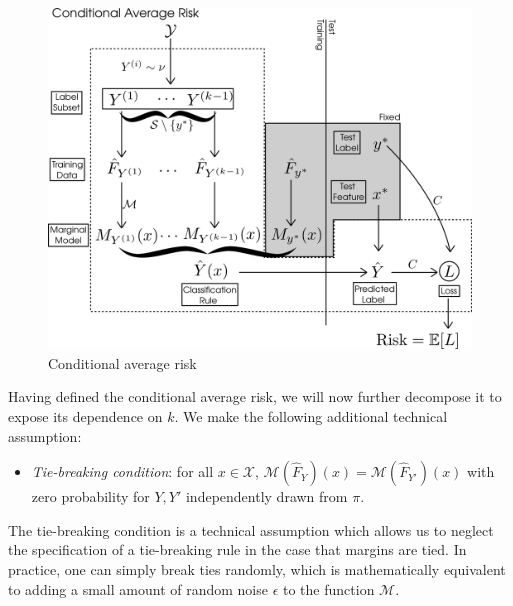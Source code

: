 \documentclass[12pt]{article}
\begin{document}

\begin{figure}[h]
\centering
\includegraphics[scale = 0.3]{extrapolation_figures/conditional_risk.png}
\caption{Conditional average risk}\label{fig:conditional_risk}
\end{figure}

Having defined the conditional average risk, we will now further
decompose it to expose its dependence on $k$.
We make the following additional technical assumption:
\begin{itemize}
\item 
\emph{Tie-breaking condition}: for all $x \in \mathcal{X}$,
$\mathcal{M}(\hat{F}_Y)(x) = \mathcal{M}(\hat{F}_{Y'})(x)$
with zero probability for $Y, Y'$ independently drawn from $\pi$.
\end{itemize}
The tie-breaking condition is a technical assumption which allows us
to neglect the specification of a tie-breaking rule in the case that
margins are tied.  In practice, one can simply break ties randomly,
which is mathematically equivalent to adding a small amount of random
noise $\epsilon$ to the function $\mathcal{M}$.
\end{document}
